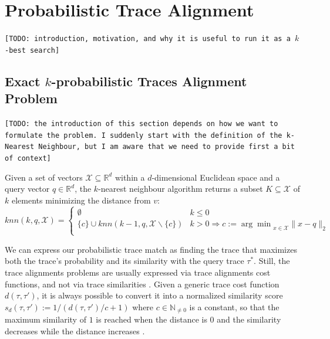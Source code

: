 \section{Probabilistic Trace Alignment}
\texttt{\color{red}[TODO: introduction, motivation, and why it is useful to run it as a $k$-best search]}

\subsection{Exact $k$-probabilistic Traces Alignment Problem}\label{subsec:exbkptap}
\texttt{\color{red}[TODO: the introduction of this section depends on how we want to formulate the problem. I suddenly start with the definition of the k-Nearest Neighbour, but I am aware that we need to provide first a bit of context]}

\begin{definition}
Given a set of vectors  $\mathcal{X}\subseteq \mathbb{R}^d$ within a $d$-dimensional Euclidean space and a query vector $q\in\mathbb{R}^d$, the $k$-nearest neighbour algorithm returns a subset $K\subseteq\mathcal{X}$ of $k$ elements minimizing the distance from $v$:
$$knn(k,q,\mathcal{X})=\begin{cases}
	\emptyset& k \leq 0\\
	\{c\}\cup knn(k-1,q,\mathcal{X}\backslash\{c\}) & k> 0 \Rightarrow c:={\arg\min}_{x\in\mathcal{X}}\|x-q\|_2\\
\end{cases}$$
\end{definition}

We can express our probabilistic trace match as finding the trace that maximizes both the trace's probability and its similarity with the query trace $\tau^*$. Still, the trace alignments problems are usually expressed via trace alignments cost functions, and not via trace similarities \cite{LeoniM17}. Given a generic trace cost function $d(\tau,\tau')$, it is always possible to convert it into a normalized similarity score $s_d(\tau,\tau'):=1/(d(\tau,\tau')/c+1)$ where $c\in\mathbb{N}_{\neq 0}$ is a constant, so that the maximum similarity of $1$ is reached when the distance is $0$ and the similarity decreases while the distance increases \cite{BergamiBM20}.

